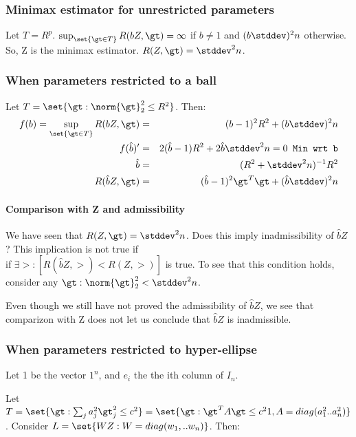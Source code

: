 \documentclass{article}
\begin{document}
\subsubsection{Minimax estimator for unrestricted parameters}
Let $T =R^{p}$. $\sup_{\set{\gt \in T}} R(bZ, \gt) = \infty$ if $b \neq 1$ and $(b\stddev)^{2}n$ otherwise. So, Z is the minimax estimator. $R(Z, \gt) = \stddev^{2}n$.

\subsubsection{When parameters restricted to a ball}
Let $T = \set{\gt:\norm{\gt}_2^{2} \leq R^{2}}$. Then:
\begin{eqnarray*}
f(b) = \sup_{\set{\gt \in T}} R(bZ, \gt) &=& (b-1)^{2}R^{2}+ (b\stddev)^{2}n\\
f(\hat{b})' &=& 2(\hat{b}-1)R^{2} + 2\hat{b}\stddev^{2}n = 0  \texttt{ Min wrt b}\\
\hat{b} &=& (R^{2} + \stddev^{2}n)^{-1}R^{2}\\
R(\hat{b}Z, \gt) &=& (\hat{b}-1)^{2}\gt^{T}\gt + (\hat{b}\stddev)^{2}n\\
\end{eqnarray*}

\paragraph*{Comparison with Z and admissibility}
We have seen that $R(Z, \gt) = \stddev^{2}n$. Does this imply inadmissibility of $\hat{b}Z$? This implication is not true if \\
if $\exists \gt: [R(\hat{b}Z, \gt) < R(Z, \gt)]$ is true. To see that this condition holds, consider any $\gt: \norm{\gt}_2^{2} < \stddev^{2}n$.

Even though we still have not proved the admissibility of $\hat{b}Z$, we see that comparizon with Z does not let us conclude that $\hat{b}Z$ is inadmissible.


\subsubsection{When parameters restricted to hyper-ellipse}
Let 1 be the vector $1^{n}$, and $e_i$ the the ith column of $I_n$.

Let $T = \set{\gt:\sum_j a_j^{2}\gt_j^{2} \leq c^{2}} = \set{\gt:\gt^{T}A\gt \leq c^{2}1, A = diag(a_1^2 .. a_n^2)}$. Consider $L = \set{WZ:W = diag(w_1, .. w_n)}$. Then:
\end{document}
